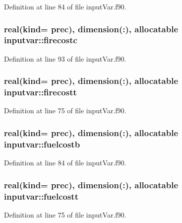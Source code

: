 Definition at line 84 of file input\-Var.\-f90.

\hypertarget{classinputvar_afa2d0c05087f3cda5d3e984037a2a354}{
\subsubsection[{firecostc}]{\setlength{\rightskip}{0pt plus 5cm}real(kind= prec), dimension(\-:), allocatable inputvar\-::firecostc}}\label{classinputvar_afa2d0c05087f3cda5d3e984037a2a354}


Definition at line 93 of file input\-Var.\-f90.

\hypertarget{classinputvar_a57526f25accbe0af7902997bd9cde614}{
\subsubsection[{firecostt}]{\setlength{\rightskip}{0pt plus 5cm}real(kind= prec), dimension(\-:), allocatable inputvar\-::firecostt}}\label{classinputvar_a57526f25accbe0af7902997bd9cde614}


Definition at line 75 of file input\-Var.\-f90.

\hypertarget{classinputvar_a7ba5eba73efe4e693920d6af7782e58e}{
\subsubsection[{fuelcostb}]{\setlength{\rightskip}{0pt plus 5cm}real(kind= prec), dimension(\-:), allocatable inputvar\-::fuelcostb}}\label{classinputvar_a7ba5eba73efe4e693920d6af7782e58e}


Definition at line 84 of file input\-Var.\-f90.

\hypertarget{classinputvar_a85ccff6d868e650d2255bb9faa7c31be}{
\subsubsection[{fuelcostt}]{\setlength{\rightskip}{0pt plus 5cm}real(kind= prec), dimension(\-:), allocatable inputvar\-::fuelcostt}}\label{classinputvar_a85ccff6d868e650d2255bb9faa7c31be}


Definition at line 75 of file input\-Var.\-f90.

